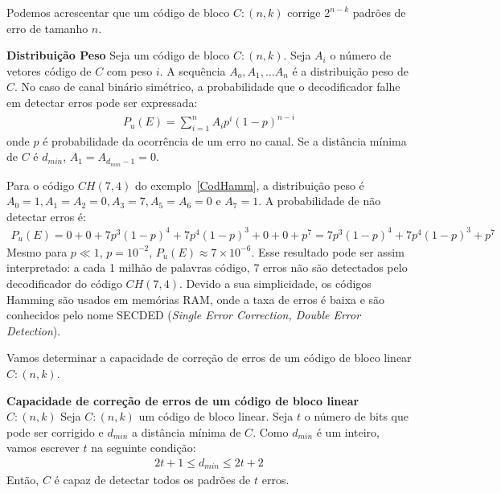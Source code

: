 Podemos acrescentar que um código de bloco $C:(n,k)$ corrige $2^{n-k}$ padrões de erro de tamanho $n$.

\begin{definition} {\bf Distribuição Peso} \label{DistPeso}  Seja um código de bloco $C:(n,k)$. Seja $A_i$ o número de vetores código de $C$ com peso $i$. A sequência $A_o, A_1, \ldots A_n$ é a distribuição peso de $C$. No caso de canal binário simétrico, a probabilidade que o decodificador falhe em detectar erros pode ser expressada:
\begin{align*}
P_u(E)=\displaystyle\sum_{i=1}^{n} A_i p^i(1 -p)^{n-i}
\end{align*}
onde $p$ é probabilidade da ocorrência de um erro no canal. Se a distância mínima de $C$ é $d_{min}$, $A_1=A_{d_{min}-1} =0$.
\end{definition}

\begin{example} Para o código $CH(7,4)$ do exemplo~\ref{CodHamm}, a distribuição peso é $A_0=1, A_1=A_2=0, A_3=7, A_5=A_6=0$ e $A_7=1$. A probabilidade de não detectar erros é:
\begin{align*}
P_u(E)=0+0+7p^3(1-p)^4+7p^4(1-p)^3+0+0+p^7=7p^3(1-p)^4+7p^4(1-p)^3+p^7
\end{align*}
Mesmo para $p \ll 1$, $p=10^{-2}$, $P_u(E) \approx 7 \times 10^{-6}$. Esse resultado pode ser assim interpretado: a cada 1 milhão de palavras código, 7 erros não são detectados pelo decodificador do código $CH(7,4)$. Devido a sua simplicidade, os códigos Hamming são usados em memórias RAM, onde a taxa de erros é baixa e são conhecidos pelo nome SECDED (\emph{Single Error Correction, Double Error Detection}).
\end{example}

Vamos determinar a capacidade de correção de erros de um código de bloco linear $C:(n,k)$. 

\begin{proposition} {\bf Capacidade de correção de erros de um código de bloco linear $C:(n,k)$} \label{CapCorrErros}  Seja $C:(n,k)$ um código de bloco linear. Seja $t$ o número de bits que pode ser corrigido e $d_{min}$ a distância mínima de $C$. Como $d_{min}$ é um inteiro, vamos escrever $t$ na seguinte condição:
\begin{align*}
2t+1 \leq d_{min} \leq 2t + 2
\end{align*}
Então, $C$ é capaz de detectar todos os padrões de $t$ erros. 
\end{proposition}


